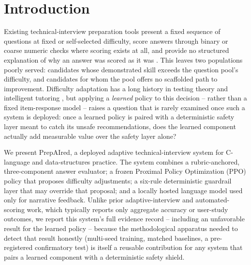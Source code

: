 \documentclass[conference]{IEEEtran}
\begin{document}
\section{Introduction}

Existing technical-interview preparation tools present a fixed sequence of questions at fixed or self-selected difficulty, score answers through binary or coarse numeric checks where scoring exists at all, and provide no structured explanation of why an answer was scored as it was \cite{weiss1982}. This leaves two populations poorly served: candidates whose demonstrated skill exceeds the question pool's difficulty, and candidates for whom the pool offers no scaffolded path to improvement. Difficulty adaptation has a long history in testing theory \cite{weiss1982} and intelligent tutoring \cite{anderson1995,corbett1994}, but applying a \emph{learned} policy to this decision -- rather than a fixed item-response model -- raises a question that is rarely examined once such a system is deployed: once a learned policy is paired with a deterministic safety layer meant to catch its unsafe recommendations, does the learned component actually add measurable value over the safety layer alone?

We present PrepAIred, a deployed adaptive technical-interview system for C-language and data-structures practice. The system combines a rubric-anchored, three-component answer evaluator; a frozen Proximal Policy Optimization (PPO) \cite{schulman2017} policy that proposes difficulty adjustments; a six-rule deterministic guardrail layer that may override that proposal; and a locally hosted language model used only for narrative feedback. Unlike prior adaptive-interview and automated-scoring work, which typically reports only aggregate accuracy or user-study outcomes, we report this system's full evidence record -- including an unfavorable result for the learned policy -- because the methodological apparatus needed to detect that result honestly (multi-seed training, matched baselines, a pre-registered confirmatory test) is itself a reusable contribution for any system that pairs a learned component with a deterministic safety shield.
\end{document}
